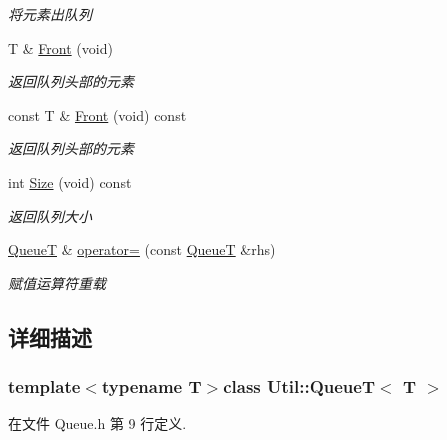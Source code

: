 \begin{DoxyCompactItemize}
\begin{DoxyCompactList}\small\item\em 将元素出队列 \end{DoxyCompactList}\item 
T \& \hyperlink{class_util_1_1_queue_t_a3feed3273640d0543f722e0a54d01bab}{Front} (void)
\begin{DoxyCompactList}\small\item\em 返回队列头部的元素 \end{DoxyCompactList}\item 
const T \& \hyperlink{class_util_1_1_queue_t_a8076426290e6d5750f2fe651620395b7}{Front} (void) const 
\begin{DoxyCompactList}\small\item\em 返回队列头部的元素 \end{DoxyCompactList}\item 
int \hyperlink{class_util_1_1_queue_t_a2f6575c0e530bb48b92537bbb37350d9}{Size} (void) const 
\begin{DoxyCompactList}\small\item\em 返回队列大小 \end{DoxyCompactList}\item 
\hyperlink{class_util_1_1_queue_t}{Queue\-T} \& \hyperlink{class_util_1_1_queue_t_a803f29fc2220ea056dcac90f3fce406f}{operator=} (const \hyperlink{class_util_1_1_queue_t}{Queue\-T} \&rhs)
\begin{DoxyCompactList}\small\item\em 赋值运算符重载 \end{DoxyCompactList}\end{DoxyCompactItemize}


\subsection{详细描述}
\subsubsection*{template$<$typename T$>$class Util\-::\-Queue\-T$<$ T $>$}



在文件 Queue.\-h 第 9 行定义.



